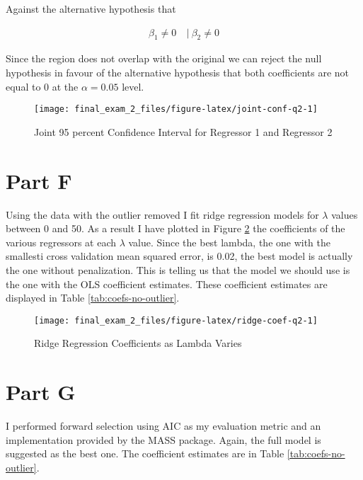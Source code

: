\documentclass[]{book}
\begin{document}
Against the alternative hypothesis that

\begin{align}
  \beta_1 \neq 0\ &|\ \beta_2 \neq 0
\end{align}

Since the region does not overlap with the original we can reject the null hypothesis in favour of the alternative hypothesis that both coefficients are not equal to 0 at the \(\alpha = 0.05\) level.

\begin{figure}

{\centering \texttt{[image: final\_exam\_2\_files/figure-latex/joint-conf-q2-1]} 

}

\caption{Joint 95 percent Confidence Interval for Regressor 1 and Regressor 2}\label{fig:joint-conf-q2}
\end{figure}

\hypertarget{part-f}{%
\section{Part F}\label{part-f}}

Using the data with the outlier removed I fit ridge regression models for \(\lambda\) values between 0 and 50. As a result I have plotted in Figure \ref{fig:ridge-coef-q2} the coefficients of the various regressors at each \(\lambda\) value. Since the best lambda, the one with the smallesti cross validation mean squared error, is 0.02, the best model is actually the one without penalization. This is telling us that the model we should use is the one with the OLS coefficient estimates. These coefficient estimates are displayed in Table \ref{tab:coefs-no-outlier}.

\begin{figure}

{\centering \texttt{[image: final\_exam\_2\_files/figure-latex/ridge-coef-q2-1]} 

}

\caption{Ridge Regression Coefficients as Lambda Varies}\label{fig:ridge-coef-q2}
\end{figure}

\hypertarget{part-g}{%
\section{Part G}\label{part-g}}

I performed forward selection using AIC as my evaluation metric and an implementation provided by the MASS package. Again, the full model is suggested as the best one. The coefficient estimates are in Table \ref{tab:coefs-no-outlier}.
\end{document}
